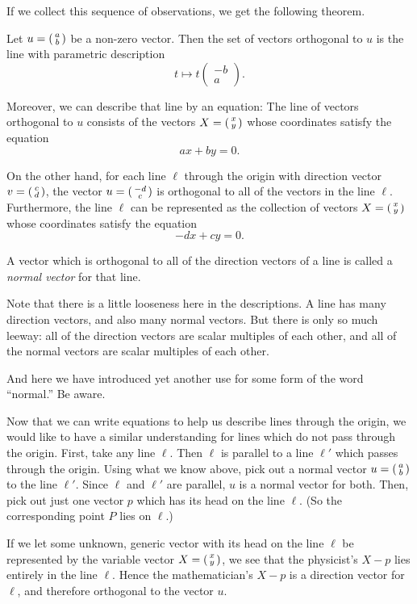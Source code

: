 \documentclass[00-livre-main.tex]{subfiles}
\begin{document}
If we collect this sequence of observations, we get the following theorem.

\begin{theorem}
Let $u = \left(\begin{smallmatrix} a \\ b \end{smallmatrix}\right)$ be a non-zero vector. Then the set of vectors orthogonal to $u$ is the line with parametric description
\[
t \mapsto t\begin{pmatrix} -b \\ a \end{pmatrix}.
\]

Moreover, we can describe that line by an equation: The line of vectors orthogonal to $u$ consists of the vectors $X = \left(\begin{smallmatrix} x \\ y \end{smallmatrix}\right)$ whose coordinates satisfy the equation
\[
ax+by = 0.
\]

On the other hand, for each line $\ell$ through the origin with direction vector $v=\left(\begin{smallmatrix} c \\ d \end{smallmatrix}\right)$, the vector $u = \left(\begin{smallmatrix} -d \\ c \end{smallmatrix}\right)$ is orthogonal to all of the vectors in the line $\ell$. Furthermore, the line $\ell$ can be represented as the collection of vectors $X=\left(\begin{smallmatrix} x \\ y \end{smallmatrix}\right)$ whose coordinates satisfy the equation
\[
-dx + cy=0.
\]
\end{theorem}

\begin{definition}
A vector which is orthogonal to all of the direction vectors of a line is called a 
\emph{normal vector} for that line.
\end{definition}

Note that there is a little looseness here in the descriptions. A line has many direction vectors, and also many normal vectors. But there is only so much leeway: all of the direction vectors are scalar multiples of each other, and all of the normal vectors are scalar multiples of each other.


And here we have introduced yet another use for some form of the word ``normal.'' Be aware.


Now that we can write equations to help us describe lines through the origin, we would like to have a similar understanding for lines which do not pass through the origin. First, take any line $\ell$. Then $\ell$ is parallel to a line $\ell'$ which passes through the origin. Using what we know above, pick out a normal vector $u = \left(\begin{smallmatrix} a \\ b \end{smallmatrix}\right)$ to the line $\ell'$. Since $\ell$ and $\ell'$ are parallel, $u$ is a normal vector for both. Then, pick out just one vector $p$ which has its head on the line $\ell$. (So the corresponding point $P$ lies on $\ell$.)

If we let some unknown, generic vector with its head on the line $\ell$ be represented by the variable vector $X = \left(\begin{smallmatrix} x \\ y \end{smallmatrix}\right)$, we see that the physicist's $X-p$ lies entirely in the line $\ell$. Hence the mathematician's $X-p$ is a direction vector for $\ell$, and therefore orthogonal to the vector $u$. 
\end{document}

